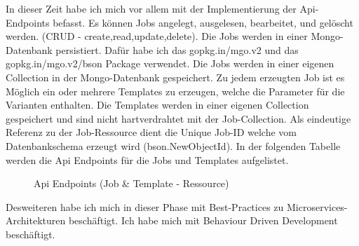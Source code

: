\documentclass[12pt]{article}
\begin{document}
In dieser Zeit habe ich mich vor allem mit der Implementierung der Api-Endpoints befasst. Es können Jobs angelegt, ausgelesen, bearbeitet, und gelöscht werden. (CRUD - create,read,update,delete). Die Jobs werden in einer Mongo-Datenbank persistiert. Dafür habe ich das gopkg.in/mgo.v2 \cite{GO-MGO} und das gopkg.in/mgo.v2/bson \cite{GO-MGO-BSON} Package verwendet. Die Jobs werden in einer eigenen Collection in der Mongo-Datenbank gespeichert. Zu jedem erzeugten Job ist es Möglich ein oder mehrere Templates zu erzeugen, welche die Parameter für die Varianten enthalten. Die Templates werden in einer eigenen Collection gespeichert und sind nicht hartverdrahtet mit der Job-Collection. Als eindeutige Referenz zu der Job-Ressource dient die Unique Job-ID welche vom Datenbankschema erzeugt wird (bson.NewObjectId). In der folgenden Tabelle werden die Api Endpoints für die Jobs und Templates aufgelistet.
\newpage
\begin{figure}[h!]
\caption{Api Endpoints (Job \& Template - Ressource)}
\label{tab:meinetabelle}
\end{figure}

Desweiteren habe ich mich in dieser Phase mit Best-Practices zu Microservices-Architekturen beschäftigt. Ich habe mich mit Behaviour Driven Development beschäftigt.
\end{document}
